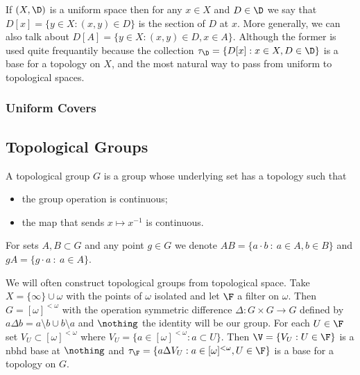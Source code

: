 \documentclass{article}
\begin{document}
    If \((X, \D)\) is a uniform space then for any \(x \in X\) and \(D \in \D\) we say that \(D[x] = \{y \in X:(x, y) \in D\}\) is the section of \(D\) at \(x\). More generally, we can also talk about \(D[A]=\{y \in X:(x, y) \in D, x \in A\}\). Although the former is used quite frequantily because the collection \(\tau_{\D} = \{D[x]:x \in X, D \in \D\}\) is a base for a topology on \(X\), and the most natural way to pass from uniform to topological spaces.
\subsubsection{Uniform Covers}

\subsection{Topological Groups}
\begin{defn}
    A topological group \(G\) is a group whose underlying set has a topology such that 
    \begin{itemize}
        \item the group operation is continuous;
        \item the map that sends \(x \mapsto x^{-1}\) is continuous.
    \end{itemize}
    For sets \(A, B \subset G\) and any point \(g \in G\) we denote \(AB = \{a\cdot b \: : \: a \in A, b \in B\}\) and \(gA = \{g\cdot a \: : \: a \in A\}\).
\end{defn}
 

We will often construct topological groups from topological space. Take \(X = \{\infty\} \cup \omega\) with the points of \(\omega\) isolated and let \(\F\) a filter on \(\omega\). Then \(G = [\omega]^{<\omega}\) with the operation symmetric difference \(\Delta: G \times G \to G\) defined by \(a\Delta b = a\setminus b \cup b\setminus a\) and \(\nothing\) the identity will be our group. For each \(U \in \F\) set \(V_U \subset [\omega]^{<\omega}\) where \(V_U = \{a \in [\omega]^{<\omega}: a \subset U\}\). Then \(\V = \{V_U : U \in \F\}\) is a nbhd base at \(\nothing\) and \(\tau_{\F} = \{a\Delta V_U : a \in [\omega]^{<\omega}, U 
\in \F\}\) is a base for a topology on \(G\).
\end{document}

